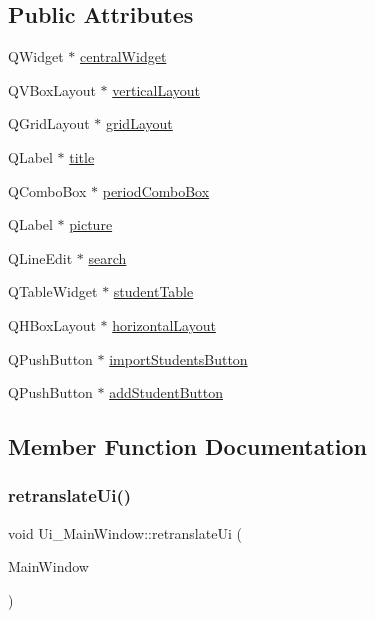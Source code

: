 \subsection*{Public Attributes}
\begin{DoxyCompactItemize}
\item 
Q\+Widget $\ast$ \hyperlink{class_ui___main_window_a30075506c2116c3ed4ff25e07ae75f81}{central\+Widget}
\item 
Q\+V\+Box\+Layout $\ast$ \hyperlink{class_ui___main_window_aecd96a04789fcfec3f98d80390ad8184}{vertical\+Layout}
\item 
Q\+Grid\+Layout $\ast$ \hyperlink{class_ui___main_window_a525ed3c5fe0784ac502ee222fba4e205}{grid\+Layout}
\item 
Q\+Label $\ast$ \hyperlink{class_ui___main_window_a330a07aad35056d3f75fb65ca7d96270}{title}
\item 
Q\+Combo\+Box $\ast$ \hyperlink{class_ui___main_window_a6fca6ae804dcc6d8a2f652261fc6a5d2}{period\+Combo\+Box}
\item 
Q\+Label $\ast$ \hyperlink{class_ui___main_window_ad167a85dbf5606e23327e56d2fc3d730}{picture}
\item 
Q\+Line\+Edit $\ast$ \hyperlink{class_ui___main_window_abbbed8fcec35fab90b6d0e87d47ba809}{search}
\item 
Q\+Table\+Widget $\ast$ \hyperlink{class_ui___main_window_a8a4ca2500b06916259580c9e0da5e4e7}{student\+Table}
\item 
Q\+H\+Box\+Layout $\ast$ \hyperlink{class_ui___main_window_acd6fdc9ebacc4b25b834162380d75ce8}{horizontal\+Layout}
\item 
Q\+Push\+Button $\ast$ \hyperlink{class_ui___main_window_aaf8d4f6e0b70a8e06b75c9cd6c9f1320}{import\+Students\+Button}
\item 
Q\+Push\+Button $\ast$ \hyperlink{class_ui___main_window_a16a3c13cd538f86f677250e44490d3fb}{add\+Student\+Button}
\end{DoxyCompactItemize}


\subsection{Member Function Documentation}
\mbox{\label{class_ui___main_window_a097dd160c3534a204904cb374412c618}} 
\subsubsection{\texorpdfstring{retranslate\+Ui()}{retranslateUi()}}
{\footnotesize\ttfamily void Ui\+\_\+\+Main\+Window\+::retranslate\+Ui (\begin{DoxyParamCaption}\item[{Q\+Main\+Window $\ast$}]{Main\+Window }\end{DoxyParamCaption})\hspace{0.3cm}{\ttfamily [inline]}}

